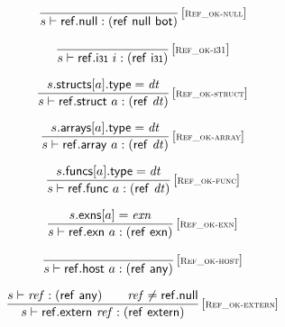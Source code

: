 \vspace{1ex}

$$
\begin{array}{@{}c@{}}\displaystyle
\frac{
}{
s \vdash \mathsf{ref{.}null} : (\mathsf{ref}~\mathsf{null}~\mathsf{bot})
} \, {[\textsc{\scriptsize Ref\_ok{-}null}]}
\qquad
\end{array}
$$

$$
\begin{array}{@{}c@{}}\displaystyle
\frac{
}{
s \vdash \mathsf{ref{.}i{\scriptstyle 31}}~i : (\mathsf{ref}~\mathsf{i{\scriptstyle 31}})
} \, {[\textsc{\scriptsize Ref\_ok{-}i31}]}
\qquad
\end{array}
$$

$$
\begin{array}{@{}c@{}}\displaystyle
\frac{
s{.}\mathsf{structs}{}[a]{.}\mathsf{type} = {\mathit{dt}}
}{
s \vdash \mathsf{ref{.}struct}~a : (\mathsf{ref}~{\mathit{dt}})
} \, {[\textsc{\scriptsize Ref\_ok{-}struct}]}
\qquad
\end{array}
$$

$$
\begin{array}{@{}c@{}}\displaystyle
\frac{
s{.}\mathsf{arrays}{}[a]{.}\mathsf{type} = {\mathit{dt}}
}{
s \vdash \mathsf{ref{.}array}~a : (\mathsf{ref}~{\mathit{dt}})
} \, {[\textsc{\scriptsize Ref\_ok{-}array}]}
\qquad
\end{array}
$$

$$
\begin{array}{@{}c@{}}\displaystyle
\frac{
s{.}\mathsf{funcs}{}[a]{.}\mathsf{type} = {\mathit{dt}}
}{
s \vdash \mathsf{ref{.}func}~a : (\mathsf{ref}~{\mathit{dt}})
} \, {[\textsc{\scriptsize Ref\_ok{-}func}]}
\qquad
\end{array}
$$

$$
\begin{array}{@{}c@{}}\displaystyle
\frac{
s{.}\mathsf{exns}{}[a] = {\mathit{exn}}
}{
s \vdash \mathsf{ref{.}exn}~a : (\mathsf{ref}~\mathsf{exn})
} \, {[\textsc{\scriptsize Ref\_ok{-}exn}]}
\qquad
\end{array}
$$

$$
\begin{array}{@{}c@{}}\displaystyle
\frac{
}{
s \vdash \mathsf{ref{.}host}~a : (\mathsf{ref}~\mathsf{any})
} \, {[\textsc{\scriptsize Ref\_ok{-}host}]}
\qquad
\end{array}
$$

$$
\begin{array}{@{}c@{}}\displaystyle
\frac{
s \vdash {\mathit{ref}} : (\mathsf{ref}~\mathsf{any})
 \qquad
{\mathit{ref}} \neq \mathsf{ref{.}null}
}{
s \vdash \mathsf{ref{.}extern}~{\mathit{ref}} : (\mathsf{ref}~\mathsf{extern})
} \, {[\textsc{\scriptsize Ref\_ok{-}extern}]}
\qquad
\end{array}
$$

